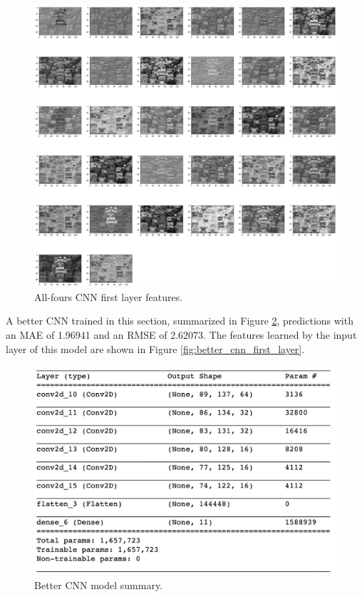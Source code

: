 \documentclass[12pt, oneside]{article}   	%
\begin{document}
\begin{figure}%
\includegraphics[width=\textwidth]{cnn_all_fours_first_layer}
\caption{\label{fig:cnn_all_fours_first_layer}All-fours CNN first layer features.}
\end{figure}

A better CNN trained in this section, summarized in Figure \ref{fig:better_cnn_summary}, predictions with an MAE of 1.96941 and an RMSE of 2.62073. The features learned by the input layer of this model are shown in Figure \ref{fig:better_cnn_first_layer}.

\begin{figure}%
\includegraphics[width=\textwidth]{better_cnn_summary}
\caption{\label{fig:better_cnn_summary}Better CNN model summary.}
\end{figure}
\end{document}
